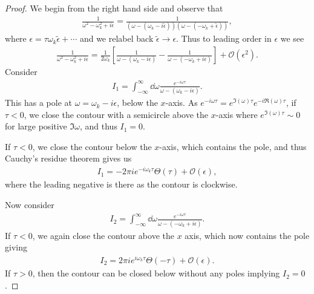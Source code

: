 \begin{proof}
    We begin from the right hand side and observe that
    \begin{align}
        \frac{1}{\omega^2 - \omega_k^2 + i \epsilon} = \frac{1}{\left( \omega - \left( \omega_k - i \widetilde{\epsilon} \right)  \right) \left( \omega - \left( - \omega_k + \widetilde{\epsilon} \right)  \right) }
    ,\end{align}
    where $\epsilon = \tau \omega_k \widetilde{\epsilon} + \cdots$ and we relabel back $\widetilde{\epsilon} \to \epsilon$. Thus to leading order in $\epsilon$ we see
    \begin{align}
        \frac{1}{\omega^2 - \omega_k^2 + i \epsilon} = \frac{1}{2\omega_k} \left[ \frac{1}{\omega - \left( \omega_k - i \epsilon \right) } - \frac{1}{\omega - \left( - \omega_k + i \epsilon \right) } \right] +\mathcal{O}\left( \epsilon^2 \right) 
    .\end{align}
    Consider
    \begin{align}
        I_1 = \int_{-\infty}^{\infty} \dd{\omega} \frac{e^{-i \omega \tau}}{\omega - \left( \omega_k - i \epsilon \right) }
    .\end{align}
    This has a pole at $\omega = \omega_k - i \epsilon$, below the $x$-axis.
    As $e^{-i \omega \tau} = e^{\Im \left( \omega \right) \tau} e^{-i \Re \left( \omega \right) \tau}$, if $\tau < 0$, we close the contour with a semicircle above the $x$-axis where $e^{\Im \left( \omega \right) \tau} \sim 0$ for large positive $\Im \omega$, and thus $I_1 = 0$. 

    If $\tau < 0$, we close the contour below the $x$-axis, which contains the pole, and thus Cauchy's residue theorem gives us
    \begin{align}
        I_1 = -2\pi i e^{-i \omega_k \tau} \Theta \left( \tau \right) + \mathcal{O}\left( \epsilon \right) 
    ,\end{align}
    where the leading negative is there as the contour is clockwise.

    Now consider
    \begin{align}
        I_2 = \int_{-\infty}^{\infty} \dd{\omega} \frac{e^{-i \omega \tau}}{\omega - \left( - \omega_k + i \epsilon \right)}
    .\end{align}
    If $\tau < 0$, we again close the contour above the $x$ axis, which now contains the pole giving
    \begin{align}
        I_2 = 2\pi i e^{i \omega_k \tau} \Theta \left( -\tau \right) + \mathcal{O}\left( \epsilon \right) 
    .\end{align}
    If $\tau > 0$, then the contour can be closed below without any poles implying $I_2 = 0$.


\end{proof}
